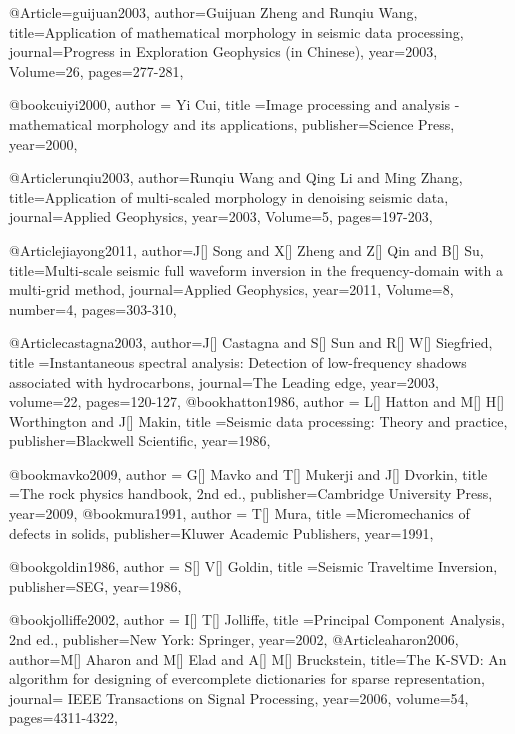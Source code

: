 @Article={guijuan2003,
  author={Guijuan Zheng and Runqiu Wang},
  title={Application of mathematical morphology in seismic data processing},
  journal={Progress in Exploration Geophysics (in Chinese)},
  year=2003,
  Volume=26,
  pages={277-281},
}

@book{cuiyi2000,
  author = {Yi Cui},
  title ={Image processing and analysis - mathematical morphology and its applications},
  publisher={Science Press},
  year=2000,
}


@Article{runqiu2003,
  author={Runqiu Wang and Qing Li and Ming Zhang},
  title={Application of multi-scaled morphology in denoising seismic data},
  journal={Applied Geophysics},
  year=2003,
  Volume=5,
  pages={197-203},
}

@Article{jiayong2011,
  author={J[] Song and X[] Zheng and Z[] Qin and B[] Su},
  title={Multi-scale seismic full waveform inversion in the frequency-domain with a multi-grid method},
  journal={Applied Geophysics},
  year=2011,
  Volume=8,
  number=4,
  pages={303-310},
}

@Article{castagna2003,
  author={J[] Castagna and S[] Sun and R[] W[] Siegfried},
  title ={Instantaneous spectral
analysis: Detection of low-frequency shadows associated with hydrocarbons},
  journal={The Leading edge},
  year=2003,
  volume=22,
  pages={120-127},
}
@book{hatton1986,
  author = {L[] Hatton and M[] H[] Worthington and J[] Makin},
  title ={Seismic data processing: Theory and practice},
  publisher={Blackwell Scientific},
  year=1986,
}

@book{mavko2009,
  author = {G[] Mavko and T[] Mukerji and J[] Dvorkin},
  title ={The rock physics handbook, 2nd ed.},
  publisher={Cambridge University Press},
  year=2009,
}
@book{mura1991,
  author = {T[] Mura},
  title ={Micromechanics of defects in solids},
  publisher={Kluwer Academic Publishers},
  year=1991,
}


@book{goldin1986,
  author = {S[] V[] Goldin},
  title ={Seismic Traveltime Inversion},
  publisher={SEG},
  year=1986,
}

@book{jolliffe2002,
  author = {I[] T[] Jolliffe},
  title ={Principal Component Analysis, 2nd ed.},
  publisher={New York: Springer},
  year=2002,
}
@Article{aharon2006,
  author={M[] Aharon and M[] Elad and A[] M[] Bruckstein},
  title={The {K}-{SVD}: An algorithm for designing of evercomplete dictionaries for sparse representation},
  journal={ IEEE Transactions on Signal Processing},
  year=2006,
  volume=54,
  pages={4311-4322},
}



